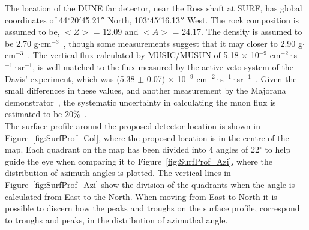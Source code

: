 The location of the DUNE far detector, near the Ross shaft at SURF, has global coordinates of 44$^{\circ}$20$'$45.21$''$ North, 103$^{\circ}$45$'$16.13$''$ West. The rock composition is assumed to be, $< Z >$ = 12.09 and $< A >$ = 24.17. The density is assumed to be 2.70 g$\cdot$cm$^{-3}$~\citep{Mei:2009py}, though some measurements suggest that it may closer to 2.90 g$\cdot$cm$^{-3}$~\citep{Gray:2010nc, Heise:2014gta}. The vertical flux calculated by MUSIC/MUSUN of 5.18 $\times$ 10$^{-9}$ cm$^{-2}\cdot$s$^{-1}\cdot$sr$^{-1}$, is well matched to the flux measured by the active veto system of the Davis' experiment, which was (5.38 $\pm$ 0.07) $\times$ 10$^{-9}$ cm$^{-2}\cdot$s$^{-1}\cdot$sr$^{-1}$~\citep{PhysRevD.27.1444}. Given the small differences in these values, and another measurement by the Majorana demonstrator~\citep{Abgrall:2016cfi}, the systematic uncertainty in calculating the muon flux is estimated to be 20\%~\citep{NDKTFNote}. \\

The surface profile around the proposed detector location is shown in Figure~\ref{fig:SurfProf_Col}, where the proposed location is in the centre of the map. Each quadrant on the map has been divided into 4 angles of 22$^{\circ}$ to help guide the eye when comparing it to Figure~\ref{fig:SurfProf_Azi}, where the distribution of azimuth angles is plotted. The vertical lines in Figure~\ref{fig:SurfProf_Azi} show the division of the quadrants when the angle is calculated from East to the North. When moving from East to North it is possible to discern how the peaks and troughs on the surface profile, correspond to troughs and peaks, in the distribution of azimuthal angle. \\

